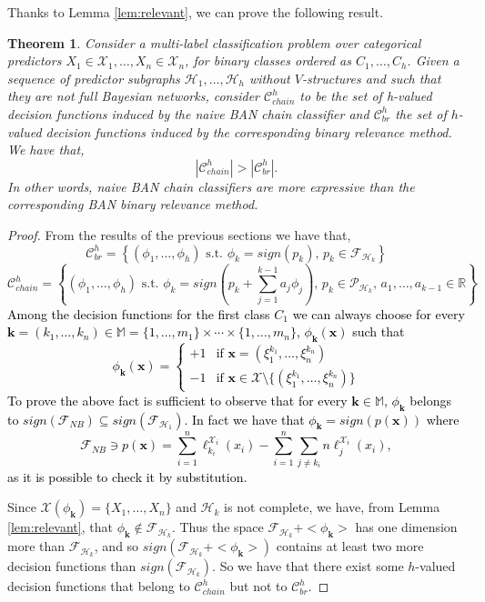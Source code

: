 \documentclass[11pt,a4paper, twoside]{book}
\newtheorem{theorem}{Theorem}[chapter]
\newcommand{\bchi}{\boldsymbol{\mathcal{X}}}
\newcommand{\nchi}{\mathcal{X}}
\begin{document}
Thanks to Lemma \ref{lem:relevant}, we can prove the following result.
\begin{theorem}
\label{teo:BRvsCH}
Consider a multi-label classification problem over categorical predictors $X_1 \in \nchi_1,\ldots,X_n \in \nchi_n $, for binary classes ordered as $C_1,\ldots,C_h$. Given a sequence of predictor subgraphs $\mathcal{H}_1,\ldots,\mathcal{H}_h$ without $V$-structures and such that they are not full Bayesian networks, consider $\mathcal{C}^{h}_{chain}$ to be the set of h-valued decision functions induced by the naive BAN chain classifier and $\mathcal{C}^{h}_{br}$ the set of $h$-valued decision functions induced by the corresponding binary relevance method. We have that,
$$ |\mathcal{C}^{h}_{chain}| > |\mathcal{C}^{h}_{br}|. $$
In other words, naive BAN chain classifiers are more expressive than the corresponding BAN binary
relevance method.
\end{theorem}
\begin{proof}
From the results of the previous sections we have that,
$$ \mathcal{C}^{h}_{br}=\left\{ (\phi_1,\ldots,\phi_h) \text{ s.t. } \phi_k=sign(p_k) \text{, } p_k\in \mathcal{F}_{\mathcal{H}_k} \right\}$$
{\small
$$ \mathcal{C}^{h}_{chain}=\left\{ (\phi_1,\ldots,\phi_h) \text{ s.t. } \phi_k=sign\left(p_k+\sum_{j=1}^{k-1}a_j \phi_{j}\right) \text{, } p_k\in \mathcal{P}_{\mathcal{H}_k}\text{, } a_1,\ldots,a_{k-1}\in\mathbb{R} \right\} $$}
\textcolor{black}{Among the decision functions for the first class $C_1$ we can always choose for every $\mathbf{k}=(k_1,\ldots,k_n) \in \mathbb{M}=\{1,\ldots,m_1\}\times\cdots\times\{1,\ldots,m_n\}$, $\phi_{\mathbf{k}}(\mathbf{x})$ such that 
$$ \phi_{\mathbf{k}}(\mathbf{x})=\begin{cases} +1 & \text{if } \mathbf{x}=(\xi_1^{k_1},\ldots,\xi_n^{k_n}) \\
                                            -1 & \text{if } \mathbf{x} \in {\bchi}\setminus \{(\xi_1^{k_1},\ldots,\xi_n^{k_n}) \}
\end{cases}$$}
\textcolor{black}{To prove the above fact is sufficient to observe that for every $\mathbf{k} \in \mathbb{M}$, $\phi_{\mathbf{k}}$ belongs to $sign(\mathcal{F}_{NB})\subseteq sign(\mathcal{F}_{\mathcal{H}_1})$.
In fact we have that $\phi_{\mathbf{k}}=sign(p(\mathbf{x}))$ where
$$ \mathcal{F}_{NB} \ni p(\mathbf{x})=\sum_{i=1}^n\ell_{k_i}^{\nchi_i}(x_i)-\sum_{i=1}^{n}\sum_{j\neq k_i} n\ell_{j}^{\nchi_i}(x_i), $$ 
as it is possible to check it by substitution.
}

Since $\mathcal{X}(\phi_{\mathbf{k}})=\{X_1,\ldots,X_n\}$ and $\mathcal{H}_k$ is not complete, we have, from Lemma \ref{lem:relevant}, that $\phi_{{\mathbf{k}}} \notin \mathcal{F}_{\mathcal{H}_k}$. Thus the space $\mathcal{F}_{\mathcal{H}_k}+<\phi_{{\mathbf{k}}}>$ has one dimension more than $\mathcal{F}_{\mathcal{H}_k}$, and so $sign(\mathcal{F}_{\mathcal{H}_k}+<\phi_{{\mathbf{k}}}>)$ contains at least two more decision functions than $sign(\mathcal{F}_{\mathcal{H}_k})$.
So we have that there exist some $h$-valued decision functions that belong to $\mathcal{C}^{h}_{chain}$ but not to $\mathcal{C}^{h}_{br}$. 
\end{proof}
\end{document}

